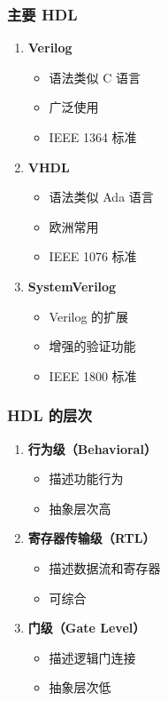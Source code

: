 \subsubsection{主要 HDL}

\begin{enumerate}
  \item \textbf{Verilog}
    \begin{itemize}
      \item 语法类似 C 语言
      \item 广泛使用
      \item IEEE 1364 标准
    \end{itemize}

  \item \textbf{VHDL}
    \begin{itemize}
      \item 语法类似 Ada 语言
      \item 欧洲常用
      \item IEEE 1076 标准
    \end{itemize}

  \item \textbf{SystemVerilog}
    \begin{itemize}
      \item Verilog 的扩展
      \item 增强的验证功能
      \item IEEE 1800 标准
    \end{itemize}
\end{enumerate}

\subsubsection{HDL 的层次}

\begin{enumerate}
  \item \textbf{行为级（Behavioral）}
    \begin{itemize}
      \item 描述功能行为
      \item 抽象层次高
    \end{itemize}

  \item \textbf{寄存器传输级（RTL）}
    \begin{itemize}
      \item 描述数据流和寄存器
      \item 可综合
    \end{itemize}

  \item \textbf{门级（Gate Level）}
    \begin{itemize}
      \item 描述逻辑门连接
      \item 抽象层次低
    \end{itemize}
\end{enumerate}

